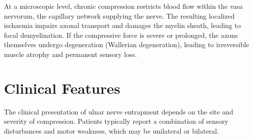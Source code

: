 At a microscopic level, chronic compression restricts blood flow within the vasa nervorum, the capillary network supplying the nerve. The resulting localized ischaemia impairs axonal transport and damages the myelin sheath, leading to focal demyelination. If the compressive force is severe or prolonged, the axons themselves undergo degeneration (Wallerian degeneration), leading to irreversible muscle atrophy and permanent sensory loss.

\section*{Clinical Features}
The clinical presentation of ulnar nerve entrapment depends on the site and severity of compression. Patients typically report a combination of sensory disturbances and motor weakness, which may be unilateral or bilateral.

